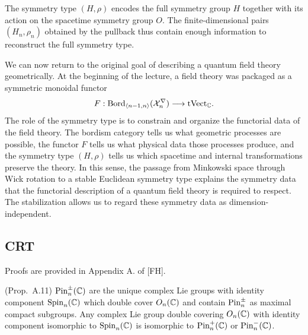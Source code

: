 \documentclass[a4paper,11pt]{article}
\begin{document}
\begin{remark}
The symmetry type $(H,\rho)$ encodes the full symmetry group $H$ together with its action on the spacetime symmetry group $O$. The finite-dimensional pairs $(H_n,\rho_n)$ obtained by the pullback thus contain enough information to reconstruct the full symmetry type.
\end{remark}

We can now return to the original goal of describing a quantum field
theory geometrically. At the beginning of the lecture, a field theory was packaged as a
symmetric monoidal functor
\[
    F:
    {\rm Bord}_{\langle n-1,n\rangle}
    (\mathcal X_n^\nabla)
    \longrightarrow
    {\rm tVect}_{\mathbb C}.
\]
The role of the symmetry type is to constrain and organize the functorial data of the field theory. The bordism category tells us what geometric processes are possible, the functor $F$ tells us what physical data those processes produce, and the symmetry type $(H,\rho)$ tells us which spacetime and internal transformations preserve the theory. In this sense, the passage from Minkowski space through Wick rotation to a stable Euclidean symmetry type explains the symmetry data that the functorial description of a quantum field theory is required to respect. The stabilization allows us to regard these symmetry data as dimension-independent.

\subsection{CRT}
Proofs are provided in Appendix A. of [FH].
\begin{statement} (Prop.~A.11) ${\rm Pin}^{\pm}_n(\mathbb{C})$ are the unique complex Lie groups with
        identity component ${\rm Spin}_n(\mathbb{C})$ which double cover $O_n(\mathbb{C})$ and contain
        ${\rm Pin}^{\pm}_n$ as maximal compact subgroups. Any complex Lie group double
        covering $O_n(\mathbb{C})$ with identity component isomorphic to ${\rm Spin}_n(\mathbb{C})$ is
        isomorphic to ${\rm Pin}^{+}_n(\mathbb{C})$ or ${\rm Pin}^{-}_n(\mathbb{C})$.
\end{statement}
\end{document}
